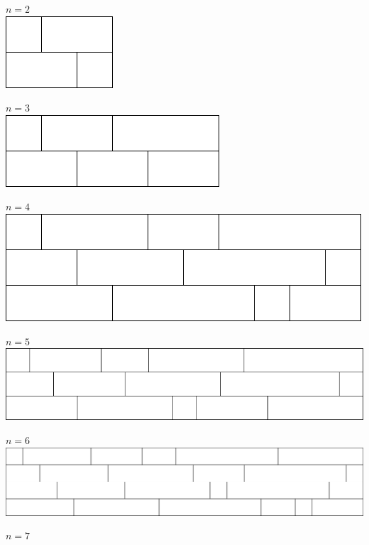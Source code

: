 $n = 2$\\
\includegraphics[scale=.3]{../solutions/2}
\par\vspace{1em}
$n = 3$\\
\includegraphics[scale=.3]{../solutions/3}
\par\vspace{1em}
$n = 4$\\
\includegraphics[scale=.3]{../solutions/4}
\par\vspace{1em}
$n = 5$\\
\includegraphics[scale=.3]{../solutions/5}
\par\vspace{1em}
$n = 6$\\
\includegraphics[scale=.3]{../solutions/6}
\par\vspace{1em}
$n = 7$\\
